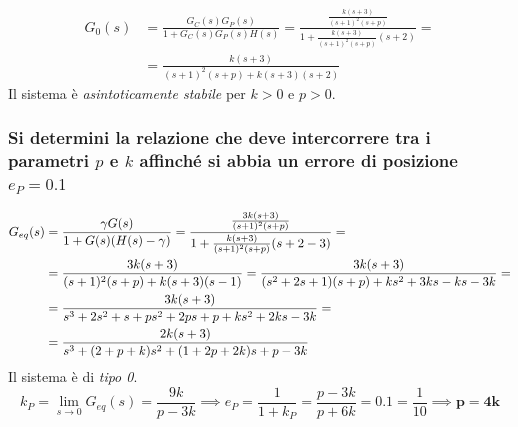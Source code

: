 \begin{align*}
	G_0(s) &= \frac{G_C(s)G_P(s)}{1+G_C(s)G_P(s)H(s)} = \frac{\frac{k(s+3)}{(s+1)^2(s+p)}}{1+\frac{k(s+3)}{(s+1)^2(s+p)}(s+2)} = \\
	&= \frac{k(s+3)}{(s+1)^2(s+p)+k(s+3)(s+2)}
\end{align*}
Il sistema è \emph{asintoticamente stabile} per \(k>0\) e \(p>0\).

\subsubsection{Si determini la relazione che deve intercorrere tra i parametri \(p\) e \(k\) affinché si abbia un errore di posizione \(e_P=0.1\)}

\begin{align*}
G_{eq}(s) &= \frac{\gamma G(s)}{1+G(s)\qty(H(s)-\gamma)} = \frac{\frac{3k(s+3)}{(s+1)^2(s+p)}}{1+\frac{k(s+3)}{(s+1)^2(s+p)}(s+2-3)} = \\
&= \frac{3k(s+3)}{(s+1)^2(s+p)+k(s+3)(s-1)} = \frac{3k(s+3)}{(s^2+2s+1)(s+p)+ks^2+3ks-ks-3k} = \\
&= \frac{3k(s+3)}{s^3+2s^2+s+ps^2+2ps+p+ks^2+2ks-3k} = \\
&= \frac{2k(s+3)}{s^3+(2+p+k)s^2+(1+2p+2k)s+p-3k}
\end{align*}
Il sistema è di \emph{tipo 0}.
\[k_P = \lim_{s\to0} G_{eq}(s)=\frac{9k}{p-3k} \implies e_P=\frac{1}{1+k_P}=\frac{p-3k}{p+6k}=0.1=\frac{1}{10} \implies \bm{p=4k}\]